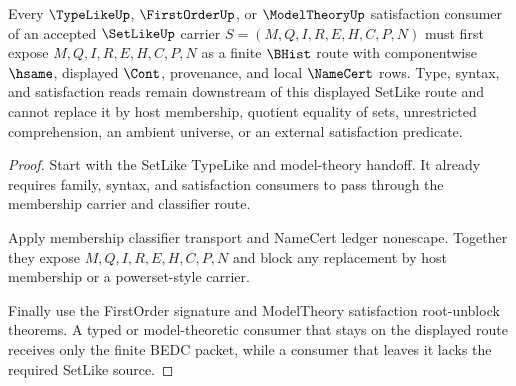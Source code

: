 \begin{theorem}
\label{thm:setlike-type-model-satisfaction-boundary}
Every $\TypeLikeUp$, $\FirstOrderUp$, or $\ModelTheoryUp$ satisfaction consumer of an accepted $\SetLikeUp$ carrier $S=(M,Q,I,R,E,H,C,P,N)$ must first expose $M,Q,I,R,E,H,C,P,N$ as a finite $\BHist$ route with componentwise $\hsame$, displayed $\Cont$, provenance, and local $\NameCert$ rows. Type, syntax, and satisfaction reads remain downstream of this displayed SetLike route and cannot replace it by host membership, quotient equality of sets, unrestricted comprehension, an ambient universe, or an external satisfaction predicate.
\end{theorem}
\begin{proof}
Start with the SetLike TypeLike and model-theory handoff. It already requires family, syntax, and satisfaction consumers to pass through the membership carrier and classifier route.

Apply membership classifier transport and NameCert ledger nonescape. Together they expose $M,Q,I,R,E,H,C,P,N$ and block any replacement by host membership or a powerset-style carrier.

Finally use the FirstOrder signature and ModelTheory satisfaction root-unblock theorems. A typed or model-theoretic consumer that stays on the displayed route receives only the finite BEDC packet, while a consumer that leaves it lacks the required SetLike source.
\end{proof}

